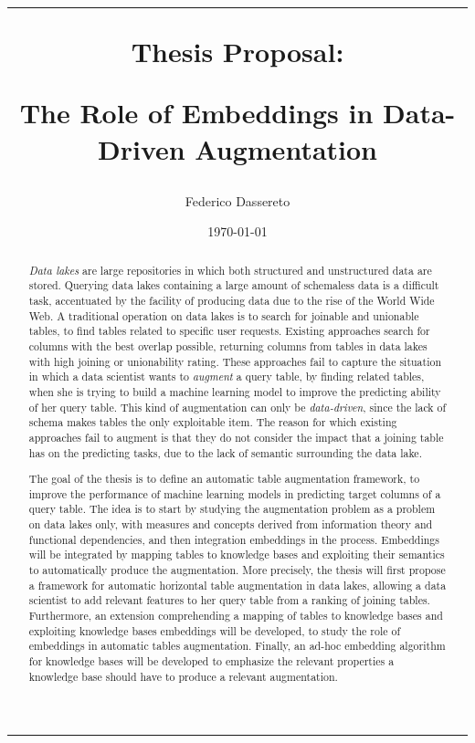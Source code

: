 \documentclass[a4paper,11pt, english]{article}
\title{\vspace{0cm}
\hrule
\vspace{1cm}
\centerline{\LARGE{Thesis Proposal:}}
\vspace{0.5cm}
\centerline{\LARGE {\bf The Role of Embeddings in Data-Driven Augmentation}}
}
\author{Federico Dassereto}
\date{\today}
\begin{document}
\maketitle
\hrule 
\vspace{1cm}

\begin{abstract}
    \textit{Data lakes} are large repositories in which both structured and unstructured data are stored. Querying data lakes containing a large amount of schemaless data is a difficult task, accentuated by the facility of producing data due to the rise of the World Wide Web. A traditional operation on data lakes is to search for joinable and unionable tables, to find tables related to specific user requests. Existing approaches search for columns with the best overlap possible, returning columns from tables in data lakes with high joining or unionability rating. These approaches fail to capture the situation in which a data scientist wants to \textit{augment} a query table, by finding related tables, when she is trying to build a machine learning model to improve the predicting ability of her query table. This kind of augmentation can only be \textit{data-driven}, since the lack of schema makes tables the only exploitable item. The reason for which existing approaches fail to augment is that they do not consider the impact that a joining table has on the predicting tasks, due to the lack of semantic surrounding the data lake. 

    The goal of the thesis is to define an automatic table augmentation framework, to improve the performance of machine learning models in predicting target columns of a query table. The idea is to start by studying the augmentation problem as a problem on data lakes only, with measures and concepts derived from information theory and functional dependencies, and then integration embeddings in the process. Embeddings will be integrated by mapping tables to knowledge bases and exploiting their semantics to automatically produce the augmentation. More precisely, the thesis will first propose a framework for automatic horizontal table augmentation in data lakes, allowing a data scientist to add relevant features to her query table from a ranking of joining tables. Furthermore, an extension comprehending a mapping of tables to knowledge bases and exploiting knowledge bases embeddings will be developed, to study the role of embeddings in automatic tables augmentation. Finally, an ad-hoc embedding algorithm for knowledge bases will be developed to emphasize the relevant properties a knowledge base should have to produce a relevant augmentation.
\end{abstract}

\newpage














\printbibliography
\end{document}
